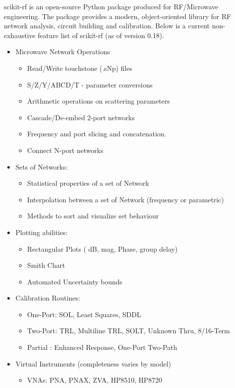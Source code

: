 \documentclass{IEEEjmw}
\begin{document}
scikit-rf is an open-source Python package produced for RF/Microwave engineering. The package provides a modern, object-oriented library for RF network analysis, circuit building and calibration. Below is a current non-exhaustive feature list of scikit-rf (as of version 0.18).

\begin{itemize}
	\item	Microwave Network Operations
	\begin{itemize}
	\item	Read/Write touchstone (.sNp) files
	\item	S/Z/Y/ABCD/T - parameter conversions
	\item	Arithmetic operations on scattering parameters
	\item	Cascade/De-embed 2-port networks
	\item	Frequency and port slicing and concatenation.
	\item	Connect N-port networks
	\end{itemize}
\item	Sets of Networks:
	\begin{itemize}
		\item Statistical properties of a set of Network
		\item Interpolation between a set of Network (frequency or parametric)
		\item Methods to sort and visualize set behaviour
	\end{itemize}
\item	Plotting abilities:
	\begin{itemize}
		\item Rectangular Plots ( dB, mag, Phase, group delay)
		\item Smith Chart
		\item Automated Uncertainty bounds
	\end{itemize}
\item	Calibration Routines:
	\begin{itemize}
		\item One-Port: SOL, Least Squares, SDDL
		\item Two-Port: TRL, Multiline TRL, SOLT, Unknown Thru, 8/16-Term
		\item Partial : Enhanced Response, One-Port Two-Path
	\end{itemize}
\item	Virtual Instruments (completeness varies by model)
	\begin{itemize}
		\item VNAs: PNA, PNAX, ZVA, HP8510, HP8720

\end{itemize}
\end{itemize}
\end{document}
